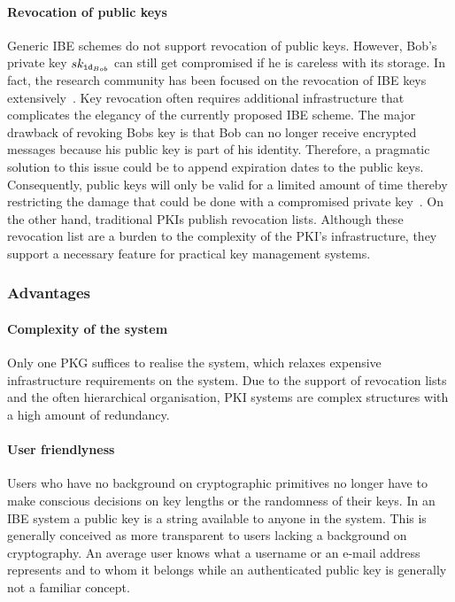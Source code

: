 \paragraph{Revocation of public keys}
Generic IBE schemes do not support revocation of public keys. However, Bob's private key $sk_{\mathtt{id}_{Bob}}$ can still get compromised if he is careless with its storage. In fact, the research community has been focused on the revocation of IBE keys extensively~\cite{art:BoldyrevaGK12,art:BonehDTW01,art:HanaokaHSI05,art:LibertQ03}. Key revocation often requires additional infrastructure that complicates the elegancy of the currently proposed IBE scheme. The major drawback of revoking Bobs key is that Bob can no longer receive encrypted messages because his public key is part of his identity. Therefore, a pragmatic solution to this issue could be to append expiration dates to the public keys. Consequently, public keys will only be valid for a limited amount of time thereby restricting the damage that could be done with a compromised private key~\cite{art:BonehF01}. On the other hand, traditional PKIs publish revocation lists. Although these revocation list are a burden to the complexity of the PKI's infrastructure, they support a necessary feature for practical key management systems. 

\subsubsection{Advantages}
\paragraph{Complexity of the system}
Only one PKG suffices to realise the system, which relaxes expensive infrastructure requirements on the system. Due to the support of revocation lists and the often hierarchical organisation, PKI systems are complex structures with a high amount of redundancy.

\paragraph{User friendlyness}
Users who have no background on cryptographic primitives no longer have to make conscious decisions on key lengths or the randomness of their keys. In an IBE system a public key is a string available to anyone in the system. This is generally conceived as more transparent to users lacking a background on cryptography. An average user knows what a username or an e-mail address represents and to whom it belongs while an authenticated public key is generally not a familiar concept.

